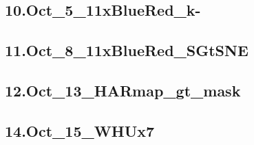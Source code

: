 \subsection{10.Oct\_5\_11xBlueRed\_k-} \label{10.Oct_5_11xBlueRed_k-_label}
\subsection{11.Oct\_8\_11xBlueRed\_SGtSNE} \label{11.Oct_8_11xBlueRed_SGtSNE_label}
\subsection{12.Oct\_13\_HARmap\_gt\_mask} \label{12.Oct_13_HARmap_gt_mask_label}
\subsection{14.Oct\_15\_WHUx7} \label{14.Oct_15_WHUx7_label}

\newpage

